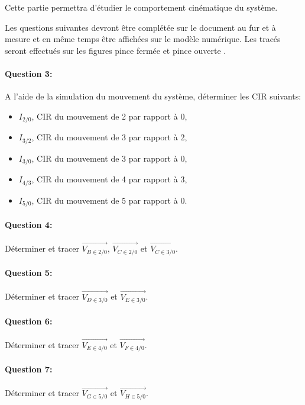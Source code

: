Cette partie permettra d'étudier le comportement cinématique du système.

Les questions suivantes devront être complétée sur le document au fur et à mesure et en même temps être affichées sur le modèle numérique. Les tracés seront effectués sur les figures \og pince fermée \fg et \og pince ouverte \fg.

\paragraph{Question 3:} A l'aide de la simulation du mouvement du système, déterminer les CIR suivants:
\begin{itemize}
 \item $I_{2/0}$, CIR du mouvement de 2 par rapport à 0,
 \item $I_{3/2}$, CIR du mouvement de 3 par rapport à 2,
 \item $I_{3/0}$, CIR du mouvement de 3 par rapport à 0,
 \item $I_{4/3}$, CIR du mouvement de 4 par rapport à 3,
 \item $I_{5/0}$, CIR du mouvement de 5 par rapport à 0.
\end{itemize}

\paragraph{Question 4:} Déterminer et tracer $\overrightarrow{V_{B\in 2/0}}$, $\overrightarrow{V_{C\in 2/0}}$ et $\overrightarrow{V_{C\in 3/0}}$.

\reponse[1]

\paragraph{Question 5:} Déterminer et tracer $\overrightarrow{V_{D\in 3/0}}$ et $\overrightarrow{V_{E\in 3/0}}$.

\reponse[1]

\paragraph{Question 6:} Déterminer et tracer $\overrightarrow{V_{E\in 4/0}}$ et $\overrightarrow{V_{F\in 4/0}}$.

\reponse[1]

\paragraph{Question 7:} Déterminer et tracer $\overrightarrow{V_{G \in 5/0}}$ et $\overrightarrow{V_{H\in 5/0}}$.

